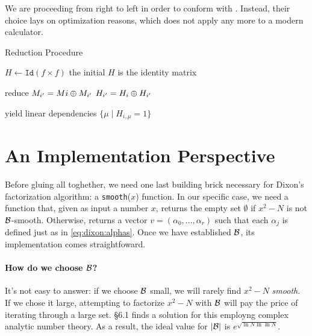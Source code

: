 \begin{remark}
  We are proceeding from right to left in order to conform with
  \cite{morrison-brillhart}.
  Instead, their choice lays on optimization reasons, which does
  not apply any more to a modern calculator.
\end{remark}

\begin{algorithm}
  \caption{Reduction Procedure  \label{alg:dixon:kernel}}
  \begin{algorithmic}[1]
    \State $H \gets \texttt{Id}(f \times f)$
    \Comment the initial $H$ is the identity matrix

    \Comment reduce
              \State $M_{i'} = Mi \oplus M_{i'}$
              \State $H_{i'} = H_i \oplus H_{i'}$
            \EndIf
          \EndFor
          \State {}
        \EndIf
      \EndFor
    \EndFor

    \Comment yield linear dependencies
         $\{\mu  \mid H_{i,\mu} = 1\}$
      \EndIf
    \EndFor
    \EndFunction
  \end{algorithmic}
\end{algorithm}


\section{An Implementation Perspective}

Before gluing all toghether, we need one last building brick necessary for
Dixon's factorization algorithm: a \texttt{smooth}($x$) function. In our
specific case, we need a function that, given as input a number $x$, returns the
empty set $\emptyset$ if $x^2 -N$ is not $\mathcal{B}$-smooth. Otherwise,
returns a vector $v = (\alpha_0, \ldots, \alpha_r)$ such that each $\alpha_j$ is
defined just as in \ref{eq:dixon:alphas}. Once we have established $\mathcal{B}$, its
implementation comes straightfoward.

\paragraph{How do we choose $\mathcal{B}$?}
It's not easy to answer: if we choose $\mathcal{B}$ small, we will rarely find
$x^2 -N$ \emph{smooth}. If we chose it large, attempting to factorize $x^2 -N$
with $\mathcal{B}$ will pay the price of iterating through a large set.
\cite{Crandall} \S 6.1 finds a solution for this employng complex analytic
number theory. As a  result, the ideal value for $|\mathcal{B}|$ is
$e^{\sqrt{\ln N \ln \ln N}}$.


